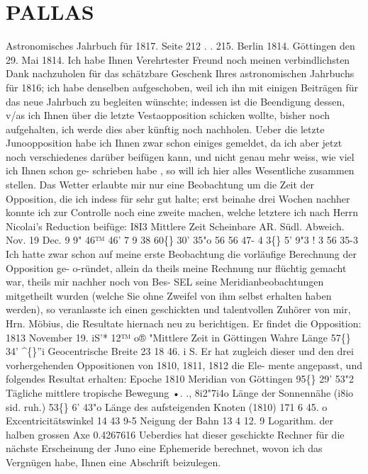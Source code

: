 \documentclass[12pt,a4paper]{article}
\newcommand{\degree}{\textdegree}
\begin{document}
\newpage

\section*{PALLAS}
Astronomisches  Jahrbuch  für  1817.     Seite  212  .  .  215.     Berlin  1814. 
Göttingen  den  29.  Mai  1814. 
Ich  habe  Ihnen  Verehrtester  Freund  noch  meinen  verbindlichsten  Dank  nachzuholen  für  das 
schätzbare  Geschenk  Ihres  astronomischen  Jahrbuchs  für  1816;  ich  habe  denselben  aufgeschoben,  weil  ich 
ihn  mit  einigen  Beiträgen  für  das  neue  Jahrbuch  zu  begleiten  wünschte;  indessen  ist  die  Beendigung 
dessen,  v/as  ich  Ihnen  über  die  letzte  Vestaopposition  schicken  wollte,  bisher  noch  aufgehalten,  ich 
werde  dies  aber  künftig  noch  nachholen. 
Ueber  die  letzte  Junoopposition  habe  ich  Ihnen  zwar  schon  einiges  gemeldet,  da  ich  aber  jetzt 
noch  verschiedenes  darüber  beifügen  kann,  und  nicht  genau  mehr  weiss,  wie  viel  ich  Ihnen  schon  ge- 
schrieben habe ,  so  will  ich  hier  alles  Wesentliche  zusammen  stellen.  Das  Wetter  erlaubte  mir  nur  eine 
Beobachtung  um  die  Zeit  der  Opposition,  die  ich  indess  für  sehr  gut  halte;  erst  beinahe  drei  Wochen 
nachher  konnte  ich  zur  Controlle  noch  eine  zweite  machen,  welche  letztere  ich  nach  Herrn  Nicolai's 
Reduction  beifüge: 
I8I3 
Mittlere  Zeit 
Scheinbare  AR. 
Südl.  Abweich. 
Nov.  19 
Dec.     9 
9"  46™  46' 
7       9     38 
60\degree\{\}  30'    35"o 
56     56     47-  4 
3\degree\{\}     5'      9"3 
!     3     56     35-3 
Ich  hatte  zwar  schon  auf  meine  erste  Beobachtung  die  vorläufige  Berechnung  der  Opposition  ge- 
o-ründet,  allein  da  theils  meine  Rechnung  nur  flüchtig  gemacht  war,  theils  mir  nachher  noch  von  Bes- 
SEL  seine  Meridianbeobachtungen  mitgetheilt  wurden  (welche  Sie  ohne  Zweifel  von  ihm  selbst  erhalten 
haben  werden),  so  veranlasste  ich  einen  geschickten  und  talentvollen  Zuhörer  von  mir,  Hrn.  Möbius,  die 
Resultate  hiernach  neu  zu  berichtigen.     Er  findet  die  Opposition: 
1813  November  19.     iS'*  12™  o®  "Mittlere  Zeit  in  Göttingen 
Wahre  Länge   
57\degree\{\}   34'     \textasciicircum\{\}''i 
Geocentrische  Breite   
23     18    46.  i  S. 
Er  hat  zugleich  dieser  und  den  drei  vorhergehenden  Oppositionen  von  1810,  1811,  1812  die  Ele- 
mente angepasst,  und  folgendes  Resultat  erhalten: 
Epoche  1810  Meridian  von  Göttingen    95\degree\{\}  29'   53"2 
Tägliche  mittlere  tropische  Bewegung   
•.     .,   8i2"7i4o 
Länge  der  Sonnennähe  (i8io  sid.  ruh.)    53\degree\{\}     6'   43"o 
Länge  des  aufsteigenden  Knoten  (1810)    171      6     45.  o 
Excentricitätswinkel    14    43      9-5 
Neigung  der  Bahn    13      4     12. 9 
Logarithm.  der  halben  grossen  Axe    0.4267616 
Ueberdies  hat  dieser  geschickte  Rechner  für  die  nächste  Erscheinung  der  Juno  eine  Ephemeride 
berechnet,  wovon  ich  das  Vergnügen  habe,  Ihnen  eine  Abschrift  beizulegen. 
\end{document}
